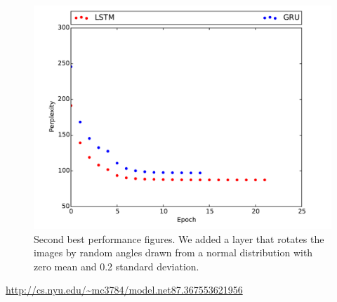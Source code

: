 \documentclass{article}
\begin{document}
\begin{figure}[ht!]
  \centering
  \includegraphics[width=1\textwidth]{LSTMvsGRU.pdf}
  \caption{Second best performance figures. We added a layer that rotates the images by random angles drawn from a normal distribution with zero mean and 0.2 standard deviation. \label{fig:best_performance}}
\end{figure}




\medskip

\small




\begin{thebibliography}{9}
 \url{http://cs.nyu.edu/~mc3784/model.net87.367553621956}
\end{thebibliography} 
\end{document}
